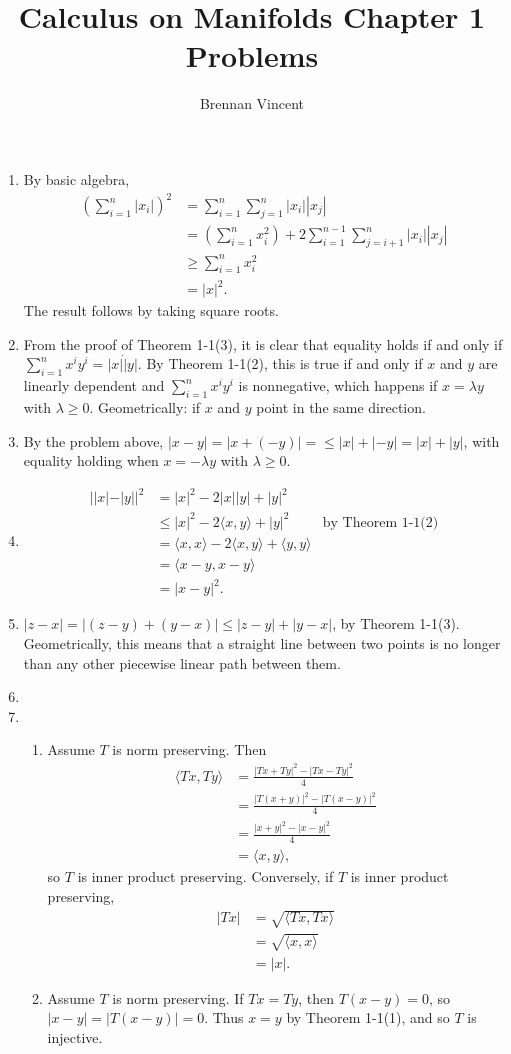 \documentclass{article}
\title{Calculus on Manifolds Chapter 1 Problems}
\author{Brennan Vincent}
\begin{document}
\maketitle
\begin{enumerate}[label=\textbf{1-\arabic*.}]
\item By basic algebra,
\begin{align*}
	\left(\sum_{i=1}^n|x_i|\right)^2 &= \sum_{i=1}^n\sum_{j=1}^n|x_i||x_j|\\
		&= \left(\sum_{i=1}^n x_i^2\right) + 2\sum_{i=1}^{n-1}\sum_{j=i+1}^n |x_i||x_j|\\
		&\geq \sum_{i=1}^n x_i^2\\
		&= |x|^2.
\end{align*}
The result follows by taking square roots.
\item
	From the proof of Theorem 1-1(3), it is clear that equality holds if and only if $\sum_{i=1}^n x^i y^i = |x|\dot|y|$. By Theorem 1-1(2), this is true if and only if $x$ and $y$ are linearly dependent and $\sum_{i=1}^n x^i y^i$ is nonnegative, which happens if $x=\lambda y$ with $\lambda \geq 0$. Geometrically: if $x$ and $y$ point in the same direction.
\item By the problem above, $|x-y|=|x+(-y)|=\leq |x| + |-y| = |x| + |y|$, with equality holding when $x=-\lambda y$ with $\lambda \geq 0$.
\item
\begin{align*}
||x|-|y||^2 &= |x|^2-2|x||y|+|y|^2\\
	&\leq |x|^2 - 2\langle x,y\rangle + |y|^2 &\text{by Theorem 1-1(2)}\\
	&= \langle x,x\rangle - 2\langle x,y\rangle + \langle y,y\rangle\\
	&= \langle x-y,x-y\rangle\\
	&= |x-y|^2.
\end{align*}
\item $|z-x| = |(z-y) + (y - x)| \leq |z-y|+|y-x|$, by Theorem 1-1(3). Geometrically, this means that a straight line between two points is no longer than any other piecewise linear path between them.
\item
\item
\begin{enumerate}
\item Assume $T$ is norm preserving. Then
\begin{align*}
\langle Tx,Ty\rangle &= \frac{|Tx+Ty|^2-|Tx-Ty|^2}{4}\\
	&= \frac{|T(x+y)|^2-|T(x-y)|^2}{4}\\
	&= \frac{|x+y|^2 - |x-y|^2}{4}\\
	&= \langle x, y \rangle,
\end{align*}
so $T$ is inner product preserving. Conversely, if $T$ is inner product preserving,
\begin{align*}
|Tx| &= \sqrt{\langle Tx,Tx\rangle}\\
	&= \sqrt{\langle x,x\rangle}\\
	&= |x|.
\end{align*}
\item Assume $T$ is norm preserving. If $Tx = Ty$, then $T(x-y) = 0$, so $|x-y|=|T(x-y)|=0$. Thus $x=y$ by Theorem 1-1(1), and so $T$ is injective.


\end{enumerate}
\end{enumerate}
\end{document}
